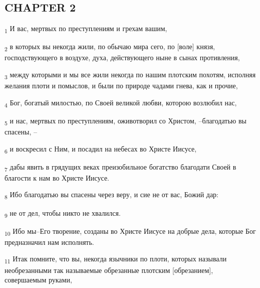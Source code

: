 \subsection{CHAPTER 2}
\begin{tcolorbox}
\textsubscript{1} И вас, мертвых по преступлениям и грехам вашим,
\end{tcolorbox}
\begin{tcolorbox}
\textsubscript{2} в которых вы некогда жили, по обычаю мира сего, по [воле] князя, господствующего в воздухе, духа, действующего ныне в сынах противления,
\end{tcolorbox}
\begin{tcolorbox}
\textsubscript{3} между которыми и мы все жили некогда по нашим плотским похотям, исполняя желания плоти и помыслов, и были по природе чадами гнева, как и прочие,
\end{tcolorbox}
\begin{tcolorbox}
\textsubscript{4} Бог, богатый милостью, по Своей великой любви, которою возлюбил нас,
\end{tcolorbox}
\begin{tcolorbox}
\textsubscript{5} и нас, мертвых по преступлениям, оживотворил со Христом, --благодатью вы спасены, --
\end{tcolorbox}
\begin{tcolorbox}
\textsubscript{6} и воскресил с Ним, и посадил на небесах во Христе Иисусе,
\end{tcolorbox}
\begin{tcolorbox}
\textsubscript{7} дабы явить в грядущих веках преизобильное богатство благодати Своей в благости к нам во Христе Иисусе.
\end{tcolorbox}
\begin{tcolorbox}
\textsubscript{8} Ибо благодатью вы спасены через веру, и сие не от вас, Божий дар:
\end{tcolorbox}
\begin{tcolorbox}
\textsubscript{9} не от дел, чтобы никто не хвалился.
\end{tcolorbox}
\begin{tcolorbox}
\textsubscript{10} Ибо мы--Его творение, созданы во Христе Иисусе на добрые дела, которые Бог предназначил нам исполнять.
\end{tcolorbox}
\begin{tcolorbox}
\textsubscript{11} Итак помните, что вы, некогда язычники по плоти, которых называли необрезанными так называемые обрезанные плотским [обрезанием], совершаемым руками,
\end{tcolorbox}

